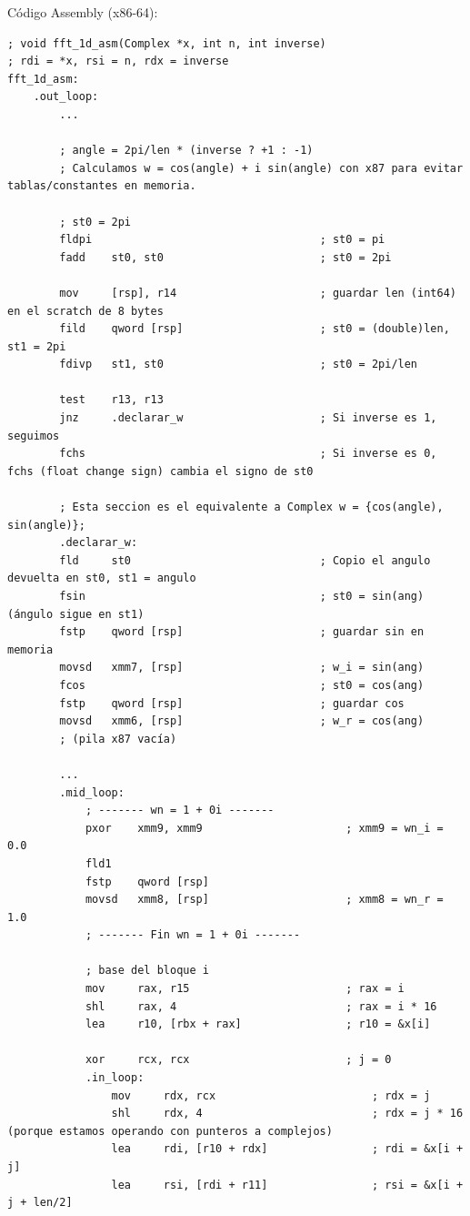 \documentclass[a4paper]{article}
\begin{document}
Código Assembly (x86-64):
\begin{verbatim}
; void fft_1d_asm(Complex *x, int n, int inverse)
; rdi = *x, rsi = n, rdx = inverse
fft_1d_asm:
    .out_loop:
        ...

        ; angle = 2pi/len * (inverse ? +1 : -1)
        ; Calculamos w = cos(angle) + i sin(angle) con x87 para evitar tablas/constantes en memoria.
        
        ; st0 = 2pi
        fldpi                                   ; st0 = pi
        fadd    st0, st0                        ; st0 = 2pi

        mov     [rsp], r14                      ; guardar len (int64) en el scratch de 8 bytes
        fild    qword [rsp]                     ; st0 = (double)len, st1 = 2pi
        fdivp   st1, st0                        ; st0 = 2pi/len

        test    r13, r13
        jnz     .declarar_w                     ; Si inverse es 1, seguimos
        fchs                                    ; Si inverse es 0, fchs (float change sign) cambia el signo de st0
        
        ; Esta seccion es el equivalente a Complex w = {cos(angle), sin(angle)};
        .declarar_w:
        fld     st0                             ; Copio el angulo devuelta en st0, st1 = angulo
        fsin                                    ; st0 = sin(ang)   (ángulo sigue en st1)
        fstp    qword [rsp]                     ; guardar sin en memoria
        movsd   xmm7, [rsp]                     ; w_i = sin(ang)
        fcos                                    ; st0 = cos(ang)
        fstp    qword [rsp]                     ; guardar cos
        movsd   xmm6, [rsp]                     ; w_r = cos(ang)
        ; (pila x87 vacía)

        ...
        .mid_loop:
            ; ------- wn = 1 + 0i -------
            pxor    xmm9, xmm9                      ; xmm9 = wn_i = 0.0
            fld1
            fstp    qword [rsp]
            movsd   xmm8, [rsp]                     ; xmm8 = wn_r = 1.0
            ; ------- Fin wn = 1 + 0i -------

            ; base del bloque i
            mov     rax, r15                        ; rax = i
            shl     rax, 4                          ; rax = i * 16
            lea     r10, [rbx + rax]                ; r10 = &x[i]

            xor     rcx, rcx                        ; j = 0
            .in_loop:
                mov     rdx, rcx                        ; rdx = j
                shl     rdx, 4                          ; rdx = j * 16 (porque estamos operando con punteros a complejos)
                lea     rdi, [r10 + rdx]                ; rdi = &x[i + j]
                lea     rsi, [rdi + r11]                ; rsi = &x[i + j + len/2]


\end{verbatim}
\end{document}
